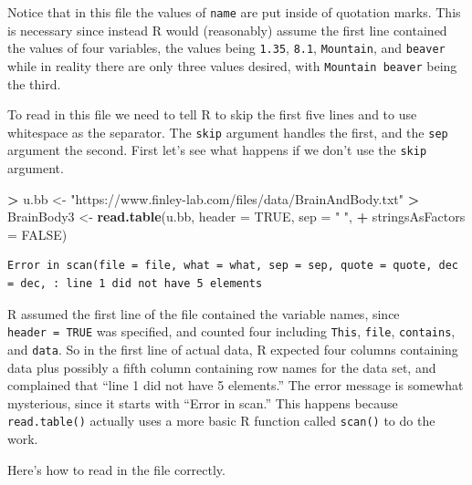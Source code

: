 \documentclass[
]{krantz}
\makeatletter
\newenvironment{Shaded}{\begin{snugshade}}{\end{snugshade}}
\newcommand{\DataTypeTok}[1]{\textcolor[rgb]{0.27,0.27,0.27}{#1}}
\newcommand{\KeywordTok}[1]{\textcolor[rgb]{0.27,0.27,0.27}{\textbf{#1}}}
\newcommand{\NormalTok}[1]{#1}
\newcommand{\OperatorTok}[1]{\textcolor[rgb]{0.43,0.43,0.43}{\textbf{#1}}}
\newcommand{\OtherTok}[1]{\textcolor[rgb]{0.37,0.37,0.37}{#1}}
\newcommand{\StringTok}[1]{\textcolor[rgb]{0.5,0.5,0.5}{#1}}
\newenvironment{kframe}{%
\medskip{}
\setlength{\fboxsep}{.8em}
 \def\at@end@of@kframe{}%
 \ifinner\ifhmode%
  \def\at@end@of@kframe{\end{minipage}}%
  \begin{minipage}{\columnwidth}%
 \fi\fi%
 \def\FrameCommand##1{\hskip\@totalleftmargin \hskip-\fboxsep
 \colorbox{shadecolor}{##1}\hskip-\fboxsep
     \hskip-\linewidth \hskip-\@totalleftmargin \hskip\columnwidth}%
 \MakeFramed {\advance\hsize-\width
   \@totalleftmargin\z@ \linewidth\hsize
   \@setminipage}}%
 {\par\unskip\endMakeFramed%
 \at@end@of@kframe}
\renewenvironment{Shaded}{\begin{kframe}}{\end{kframe}}
\makeatother
\begin{document}
Notice that in this file the values of \texttt{name} are put inside of quotation marks. This is necessary since instead R would (reasonably) assume the first line contained the values of four variables, the values being \texttt{1.35}, \texttt{8.1}, \texttt{Mountain}, and \texttt{beaver} while in reality there are only three values desired, with \texttt{Mountain\ beaver} being the third.

To read in this file we need to tell R to skip the first five lines and to use whitespace as the separator. The \texttt{skip} argument handles the first, and the \texttt{sep} argument the second. First let's see what happens if we don't use the \texttt{skip} argument.

\begin{Shaded}
\begin{Highlighting}[]
\OperatorTok{\textgreater{}}\StringTok{ }\NormalTok{u.bb \textless{}{-}}\StringTok{ "https://www.finley{-}lab.com/files/data/BrainAndBody.txt"}
\OperatorTok{\textgreater{}}\StringTok{ }\NormalTok{BrainBody3 \textless{}{-}}\StringTok{ }\KeywordTok{read.table}\NormalTok{(u.bb, }\DataTypeTok{header =} \OtherTok{TRUE}\NormalTok{, }\DataTypeTok{sep =} \StringTok{" "}\NormalTok{, }
\OperatorTok{+}\StringTok{                          }\DataTypeTok{stringsAsFactors =} \OtherTok{FALSE}\NormalTok{)}
\end{Highlighting}
\end{Shaded}

\begin{verbatim}
Error in scan(file = file, what = what, sep = sep, quote = quote, dec = dec, : line 1 did not have 5 elements
\end{verbatim}

R assumed the first line of the file contained the variable names, since \texttt{header\ =\ TRUE} was specified, and counted four including \texttt{This}, \texttt{file}, \texttt{contains}, and \texttt{data}. So in the first line of actual data, R expected four columns containing data plus possibly a fifth column containing row names for the data set, and complained that ``line 1 did not have 5 elements.'' The error message is somewhat mysterious, since it starts with ``Error in scan.'' This happens because \texttt{read.table()} actually uses a more basic R function called \texttt{scan()} to do the work.

Here's how to read in the file correctly.
\end{document}
